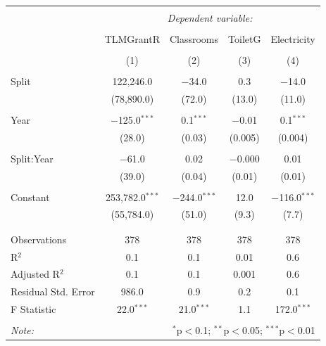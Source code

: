 \documentclass[12pt, a4paper]{article}
\begin{document}
\begin{table}[!htbp] \centering 
  \caption{} 
  \label{} 
\begin{tabular}{@{\extracolsep{5pt}}lcccc} 
\\[-1.8ex]\hline 
\hline \\[-1.8ex] 
 & \multicolumn{4}{c}{\textit{Dependent variable:}} \\ 
\cline{2-5} 
\\[-1.8ex] & TLMGrantR & Classrooms & ToiletG & Electricity \\ 
\\[-1.8ex] & (1) & (2) & (3) & (4)\\ 
\hline \\[-1.8ex] 
 Split & 122,246.0 & $-$34.0 & 0.3 & $-$14.0 \\ 
  & (78,890.0) & (72.0) & (13.0) & (11.0) \\ 
  & & & & \\ 
 Year & $-$125.0$^{***}$ & 0.1$^{***}$ & $-$0.01 & 0.1$^{***}$ \\ 
  & (28.0) & (0.03) & (0.005) & (0.004) \\ 
  & & & & \\ 
 Split:Year & $-$61.0 & 0.02 & $-$0.000 & 0.01 \\ 
  & (39.0) & (0.04) & (0.01) & (0.01) \\ 
  & & & & \\ 
 Constant & 253,782.0$^{***}$ & $-$244.0$^{***}$ & 12.0 & $-$116.0$^{***}$ \\ 
  & (55,784.0) & (51.0) & (9.3) & (7.7) \\ 
  & & & & \\ 
\hline \\[-1.8ex] 
Observations & 378 & 378 & 378 & 378 \\ 
R$^{2}$ & 0.1 & 0.1 & 0.01 & 0.6 \\ 
Adjusted R$^{2}$ & 0.1 & 0.1 & 0.001 & 0.6 \\ 
Residual Std. Error & 986.0 & 0.9 & 0.2 & 0.1 \\ 
F Statistic & 22.0$^{***}$ & 21.0$^{***}$ & 1.1 & 172.0$^{***}$ \\ 
\hline 
\hline \\[-1.8ex] 
\textit{Note:}  & \multicolumn{4}{r}{$^{*}$p$<$0.1; $^{**}$p$<$0.05; $^{***}$p$<$0.01} \\ 
\end{tabular} 
\end{table} %
\end{document}
